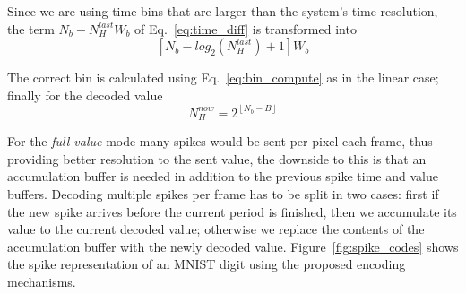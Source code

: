 \documentclass[conference]{IEEEtran}
\begin{document}
Since we are using time bins that are larger than the system's time resolution, the term $N_{b} - N_{H}^{last}W_{b}$ of Eq.~\ref{eq:time_diff} is transformed into
\begin{equation}
\left[N_{b} - log_{2}(N_{H}^{last})  + 1\right]W_{b}
\end{equation}

The correct bin is calculated using Eq.~\ref{eq:bin_compute} as in the linear case; finally for the decoded value
\begin{equation}
N_{H}^{now} = 2^{ \left\lfloor N_{b} - B \right\rfloor }
\label{eq:new_Nh_exp}
\end{equation}

For the \textit{full value} mode many spikes would be sent per pixel each frame, thus providing better resolution to the sent value, the downside to this is that an accumulation buffer is needed in addition to the previous spike time and value buffers. Decoding multiple spikes per frame has to be split in two cases: first if the new spike arrives before the current period is finished, then we accumulate its value to the current decoded value; otherwise we replace the contents of the accumulation buffer with the newly decoded value. Figure~\ref{fig:spike_codes} shows the spike representation of an MNIST digit using the proposed encoding mechanisms.
\end{document}
